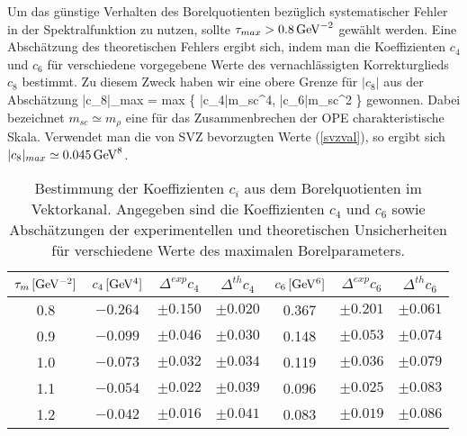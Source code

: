Um das g\"unstige Verhalten des Borelquotienten bez\"uglich 
systematischer Fehler in der Spektralfunktion zu nutzen, sollte
$\tau_{max}>0.8\,{\rm GeV}^{-2}$ gew\"ahlt werden. Eine 
Absch\"atzung des theoretischen Fehlers ergibt sich, indem man
die Koeffizienten $c_4$ und $c_6$ f\"ur verschiedene vorgegebene
Werte des vernachl\"assigten Korrekturglieds $c_8$ bestimmt. Zu 
diesem Zweck haben wir eine obere Grenze f\"ur $|c_8|$ aus der 
Absch\"atzung \cite{CM90}
\be
  |c_8|_{max}  = {\rm max} \left\{ |c_4|m_{sc}^4,
    |c_6|m_{sc}^2 \right\}
\ee
gewonnen. Dabei bezeichnet $m_{sc}\simeq m_\rho$ eine f\"ur das
Zusammenbrechen der OPE charakteristische  Skala. Verwendet
man die von SVZ bevorzugten Werte (\ref{svzval}), so ergibt sich
$|c_8|_{max}\simeq 0.045\,{\rm GeV}^8$.    
\begin{table}
\caption{Bestimmung der Koeffizienten $c_i$ aus dem Borelquotienten
im Vektorkanal. Angegeben sind die Koeffizienten $c_4$ und $c_6$
sowie Absch\"atzungen der experimentellen und theoretischen
Unsicherheiten f\"ur verschiedene Werte des maximalen Borelparameters.}  
\begin{center}
\begin{tabular}{|c||c|c|c||c|c|c||}\hline
 $\tau_m\,[\rm GeV^{-2}]$  &  $c_4\,[\rm GeV^4]$  & $\Delta^{exp} c_4$ &
       $\Delta^{th} c_4$ &  $c_6\,[\rm GeV^6]$  
	     & $\Delta^{exp} c_6$ & $\Delta^{th} c_6$  \\ \hline\hline
    0.8   &$-0.264$ & $\pm 0.150$        & $\pm 0.020$       &
             0.367  & $\pm 0.201$        & $\pm 0.061$   \\
    0.9   &$-0.099$ & $\pm 0.046$        & $\pm 0.030$       &
             0.148  & $\pm 0.053$        & $\pm 0.074$   \\	     
    1.0   &$-0.073$ & $\pm 0.032$        & $\pm 0.034$       &
             0.119  & $\pm 0.036$        & $\pm 0.079$   \\	     
    1.1   &$-0.054$ & $\pm 0.022$        & $\pm 0.039$       &
             0.096  & $\pm 0.025$        & $\pm 0.083$   \\	     
    1.2   &$-0.042$ & $\pm 0.016$        & $\pm 0.041$       &
             0.083  & $\pm 0.019$        & $\pm 0.086$   \\ \hline
\end{tabular}
\end{center}
\end{table}

